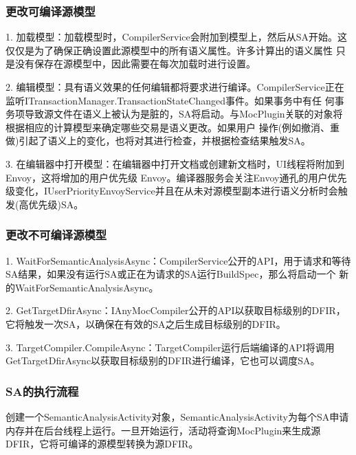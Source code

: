 \documentclass[UTF8]{ctexart}
\begin{document}
\subsubsection{更改可编译源模型}
1. 加载模型：加载模型时，CompilerService会附加到模型上，然后从SA开始。这仅仅是为了确保正确设置此源模型中的所有语义属性。许多计算出的语义属性
只是没有保存在源模型中，因此需要在每次加载时进行设置。
\par
2. 编辑模型：具有语义效果的任何编辑都将要求进行编译。CompilerService正在监听ITransactionManager.TransactionStateChanged事件。如果事务中有任
何事务项导致源文件在语义上被认为是脏的，SA将启动。与MocPlugin关联的对象将根据相应的计算模型来确定哪些交易是语义更改。如果用户
操作(例如撤消、重做)引起了语义上的变化，也将对其进行检查，并根据检查结果触发SA。
\par
3. 在编辑器中打开模型：在编辑器中打开文档或创建新文档时，UI线程将附加到Envoy，这将增加的用户优先级 Envoy。编译器服务会关注Envoy通孔的用户优先
级变化，IUserPriorityEnvoyService并且在从未对源模型副本进行语义分析时会触发(高优先级)SA。
\subsubsection{更改不可编译源模型}
1. WaitForSemanticAnalysisAsync：CompilerService公开的API，用于请求和等待SA结果，如果没有运行SA或正在为请求的SA运行BuildSpec，那么将启动一个
新的WaitForSemanticAnalysisAsync。
\par
2. GetTargetDfirAsync：IAnyMocCompiler公开的API以获取目标级别的DFIR，它将触发一次SA，以确保在有效的SA之后生成目标级别的DFIR。
\par
3. TargetCompiler.CompileAsync：TargetCompiler运行后端编译的API将调用GetTargetDfirAsync以获取目标级别的DFIR进行编译，它也可以调度SA。
\subsubsection{SA的执行流程}
创建一个SemanticAnalysisActivity对象，SemanticAnalysisActivity为每个SA申请内存并在后台线程上运行。一旦开始运行，活动将查询MocPlugin来生成源
DFIR，它将可编译的源模型转换为源DFIR。
\par
\end{document}
